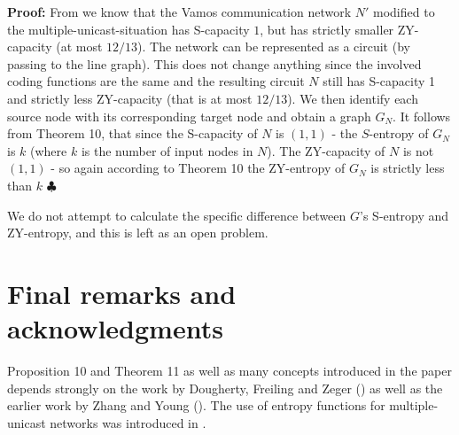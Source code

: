 \documentclass[12pt]{article}
\begin{document}
\noindent
{\bf Proof:}  From \cite{DFZ07} we know that the Vamos communication network $N'$ modified to the multiple-unicast-situation has S-capacity $1$, but has strictly smaller ZY-capacity (at most $12/13$). 
The network can be represented as a circuit (by passing to the line graph).  This does not change anything since the involved coding functions are the same and the resulting circuit $N$ still has
S-capacity 1 and strictly less ZY-capacity (that is at most $12/13$). We then identify each source node with its corresponding target node and obtain a graph $G_N$.  
It follows from Theorem 10, that since the S-capacity of $N$ is $(1,1)$ - the $S$-entropy of $G_N$ is $k$ (where $k$ is the number of input nodes in $N$).  
The ZY-capacity of $N$ is not $(1,1)$ - so again according to Theorem 10 the ZY-entropy of $G_N$ is strictly less than $k$   \hfill $\clubsuit$

We do not attempt to calculate the specific difference between $G$'s S-entropy and ZY-entropy, and this is left as an open problem.

\section{Final remarks and acknowledgments}
Proposition 10 and Theorem 11  as well as many concepts introduced in the  paper depends strongly on the work  by Dougherty, Freiling and Zeger (\cite{DFZ05,DFZ06,DFZ07}) as well as the
earlier work by Zhang and Young (\cite{ZY97}). The use of entropy functions for multiple-unicast networks was introduced in \cite{DFZ05}. 




\end{document}
